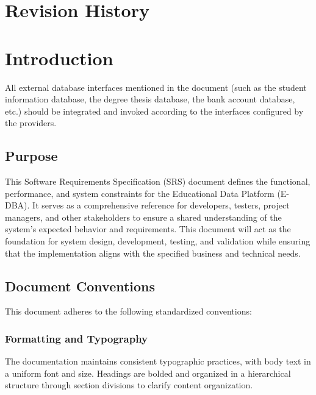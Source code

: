 
\newcommand{\myversion}{1.4}   %





\tableofcontents

\chapter*{Revision History}



\chapter{Introduction}

All external database interfaces mentioned in the document (such as the student information database, the degree thesis database, the bank account database, etc.) should be integrated and invoked according to the interfaces configured by the providers.

\section{Purpose}
This Software Requirements Specification (SRS) document defines the functional, performance, and system constraints for the Educational Data Platform (E-DBA). It serves as a comprehensive reference for developers, testers, project managers, and other stakeholders to ensure a shared understanding of the system's expected behavior and requirements. This document will act as the foundation for system design, development, testing, and validation while ensuring that the implementation aligns with the specified business and technical needs.

\section{Document Conventions}
This document adheres to the following standardized conventions:

\subsection{Formatting and Typography}
The documentation maintains consistent typographic practices, with body text in a uniform font and size. Headings are bolded and organized in a hierarchical structure through section divisions to clarify content organization.

